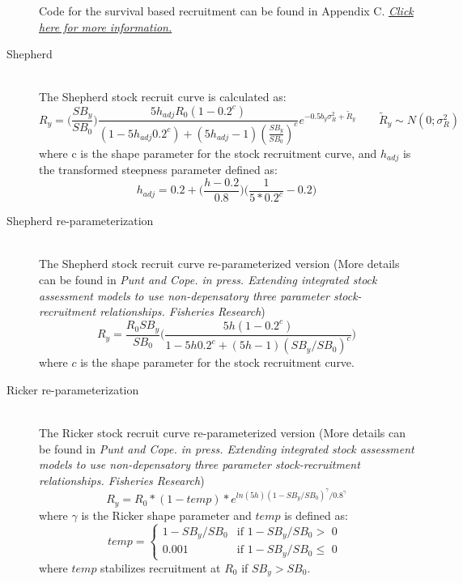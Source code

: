 \begin{description}
	Code for the survival based recruitment can be found in Appendix C. \hyperlink{AppendixC}{\textit{Click here for more information.}}

	\item[Shepherd]\hfil\\
	\hypertarget{Shepherd}{The} Shepherd stock recruit curve is calculated as:
	\begin{equation}
		R_y = \bigg(\frac{SB_y}{SB_0}\bigg)\frac{5h_{adj}R_0(1-0.2^c)}{(1-5h_{adj}0.2^c)+(5h_{adj}-1)(\frac{SB_y}{SB_0})^c}e^{-0.5b_y\sigma^2_R+\tilde{R}_y}\qquad \tilde{R}_y\sim N(0;\sigma^2_R)
	\end{equation}
	where c is the shape parameter for the stock recruitment curve, and $h_{adj}$ is the transformed steepness parameter defined as:
	\begin{equation}
		h_{adj}=0.2+\bigg(\frac{h-0.2}{0.8}\bigg)\bigg(\frac{1}{5*0.2^c}-0.2\bigg)
	\end{equation}
	
	\item[Shepherd re-parameterization]\hfil\\
	\hypertarget{Shepherd2}{The} Shepherd stock recruit curve re-parameterized version (More details can be found in \textit{Punt and Cope. in press. Extending integrated stock assessment models to use non-depensatory three parameter stock-recruitment relationships. Fisheries Research})
	\begin{equation}
		R_y = \frac{R_0SB_y}{SB_0}\bigg(\frac{5h(1-0.2^c)}{1-5h0.2^c+(5h-1)(SB_y/SB_0)^c}\bigg)
	\end{equation}
	where $c$ is the shape parameter for the stock recruitment curve.
	\item[Ricker re-parameterization]\hfil\\
	\hypertarget{Ricker2}{The} Ricker stock recruit curve re-parameterized version (More details can be found in \textit{Punt and Cope. in press. Extending integrated stock assessment models to use non-depensatory three parameter stock-recruitment relationships. Fisheries Research})
	\begin{equation}
		R_y = R_0*(1-temp)*e^{ln(5h)(1-SB_y/SB_0)^{\gamma}/0.8^{\gamma}}
	\end{equation}
	where $\gamma$ is the Ricker shape parameter and $temp$ is defined as:
	\begin{equation}
	temp = 
	\begin{cases}
		1-SB_y/SB_0 & \text{if $1-SB_y/SB_0 >$ 0 }\\
		0.001 & \text{if $1-SB_y/SB_0 \leq$ 0}
	\end{cases}		
	\end{equation}
	where $temp$ stabilizes recruitment at $R_0$ if $SB_y > SB_0$. 
\end{description}

